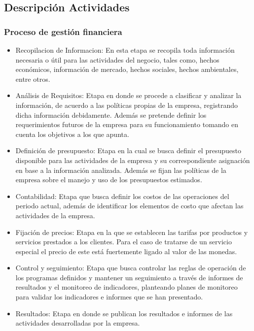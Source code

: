 {	\subsection{Descripción Actividades}
	
	\subsubsection{Proceso de gestión financiera}
	
	
	\begin{itemize}
	\item Recopilacion de Informacion: En esta etapa se recopila toda información necesaria o útil para las actividades del negocio, tales como, hechos económicos, información de mercado, hechos sociales, hechos ambientales, entre otros.
	\item Análisis de Requisitos​: Etapa en donde se procede a clasificar y analizar la información, de acuerdo a las políticas propias de la empresa, registrando dicha información debidamente. Además se pretende definir los requerimientos futuros de la empresa para su funcionamiento tomando en cuenta los objetivos a los que apunta.
	\item Definición de presupuesto​: Etapa en la cual se busca definir el presupuesto disponible para las actividades de la empresa y su correspondiente asignación en base a la información analizada. Además se fijan las políticas de la empresa sobre el manejo y uso de los presupuestos estimados.
	\item Contabilidad​: Etapa que busca definir los costos de las operaciones del periodo actual, además de identificar los elementos de costo que afectan las actividades de la empresa.
	\item Fijación de precios​: Etapa en la que se establecen las tarifas por productos y servicios prestados a los clientes. Para el caso de tratarse de un servicio especial el precio de este está fuertemente ligado al valor de las monedas.
	\item Control y seguimiento: Etapa que busca controlar las reglas de operación de los programas definidos y mantener un seguimiento a través de informes de resultados y el monitoreo de indicadores, planteando planes de monitoreo para validar los indicadores e informes que se han presentado.
	\item Resultados​: Etapa en donde se publican los resultados e informes de las actividades desarrolladas por la empresa.
	\end{itemize}
	
}
